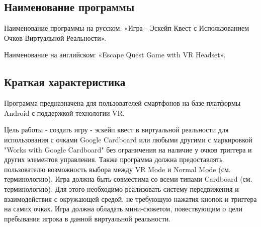 \subsection{Наименование программы}
\tab[0.75cm]Наименование программы на русском: «Игра - Эскейп Квест с 
Использованием Очков Виртуальной Реальности».

Наименование на английском: «Escape Quest Game with VR Headset». \\


\subsection{Краткая характеристика}
\tab[0.75cm]
Программа предназначена для пользователей смартфонов на базе платформы Android 
с поддержкой технологии VR. 

Цель работы - создать игру - эскейп квест в виртуальной реальности для 
использования с очками Google Cardboard или любыми другими с маркировкой "Works 
with Google Cardboard" без ограничения на наличие у очков триггера и других 
элементов управления. Также программа должна предоставлять пользователю 
возможность выбора между VR  Mode и Normal Mode (см. терминологию). Игра должна 
быть совместима со всеми типами Cardboard (см. терминологию). Для этого 
необходимо реализовать систему передвижения и взаимодействия с окружающей 
средой, не требующую нажатия кнопок и триггера на самих очках. Игра должна 
обладать мини-сюжетом, повествующим о цели пребывания игрока в данной 
виртуальной реальности.